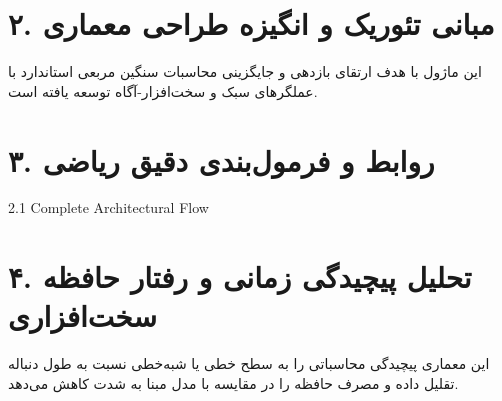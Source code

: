 \documentclass[12pt,a4paper]{article}
\begin{document}
\section*{۲. مبانی تئوریک و انگیزه طراحی معماری}
این ماژول با هدف ارتقای بازدهی و جایگزینی محاسبات سنگین مربعی استاندارد با عملگرهای سبک و سخت‌افزار-آگاه توسعه یافته است.

\section*{۳. روابط و فرمول‌بندی دقیق ریاضی}
2.1 Complete Architectural Flow

\section*{۴. تحلیل پیچیدگی زمانی و رفتار حافظه سخت‌افزاری}
این معماری پیچیدگی محاسباتی را به سطح خطی یا شبه‌خطی نسبت به طول دنباله تقلیل داده و مصرف حافظه را در مقایسه با مدل مبنا به شدت کاهش می‌دهد.
\end{document}
